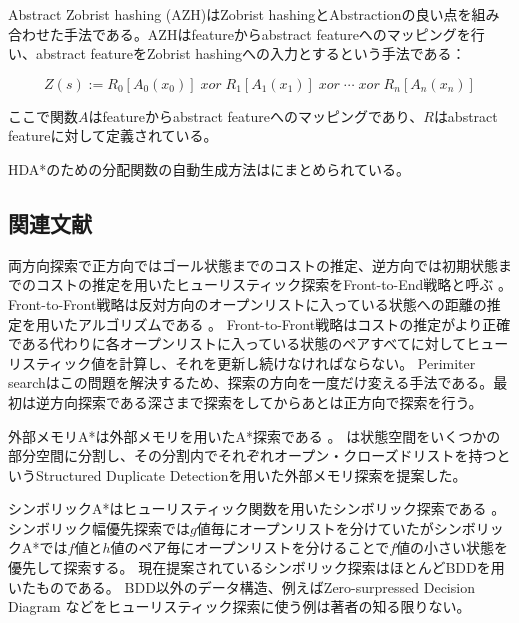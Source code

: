 Abstract Zobrist hashing (AZH)はZobrist hashingとAbstractionの良い点を組み合わせた手法である\cite{jinnai2016structured}。AZHはfeatureからabstract featureへのマッピングを行い、abstract featureをZobrist hashingへの入力とするという手法である：

\begin{equation}
\label{eq:abstract-zobrist}
 	Z(s) := R_{0}[A_0(x_{0})]\; xor\; R_{1}[A_1(x_{1})]\; xor\; \cdots\; xor\; R_{n}[A_n(x_{n})]%
\end{equation}

ここで関数$A$はfeatureからabstract featureへのマッピングであり、$R$はabstract featureに対して定義されている。

HDA*のための分配関数の自動生成方法は\cite{jinnai2017work}にまとめられている。

\subsection{関連文献}

両方向探索で正方向ではゴール状態までのコストの推定、逆方向では初期状態までのコストの推定を用いたヒューリスティック探索をFront-to-End戦略と呼ぶ \cite{pohl1971bi}。Front-to-Front戦略は反対方向のオープンリストに入っている状態への距離の推定を用いたアルゴリズムである \cite{sint1977improved}。
Front-to-Front戦略はコストの推定がより正確である代わりに各オープンリストに入っている状態のペアすべてに対してヒューリスティック値を計算し、それを更新し続けなければならない。
Perimiter searchはこの問題を解決するため、探索の方向を一度だけ変える手法である\cite{dillenburg1994perimeter,manzini1995bida}。最初は逆方向探索である深さまで探索をしてからあとは正方向で探索を行う。

外部メモリA*は外部メモリを用いたA*探索である \cite{edelkamp2004external}。
\cite{zhou2004structured}は状態空間をいくつかの部分空間に分割し、その分割内でそれぞれオープン・クローズドリストを持つというStructured Duplicate Detectionを用いた外部メモリ探索を提案した。

シンボリックA*はヒューリスティック関数を用いたシンボリック探索である \cite{edelkamp1998obdds}。
シンボリック幅優先探索では$g$値毎にオープンリストを分けていたがシンボリックA*では$f$値と$h$値のペア毎にオープンリストを分けることで$f$値の小さい状態を優先して探索する。
現在提案されているシンボリック探索はほとんどBDDを用いたものである。
BDD以外のデータ構造、例えばZero-surpressed Decision Diagram \cite{minato1993zero}などをヒューリスティック探索に使う例は著者の知る限りない。

